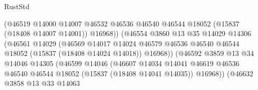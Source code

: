 \begin{lexlean}{RustStd}
\begin{coremodule}
                                        (@46519
                                          @14000
                                          @14007
                                          @46532
                                          @46536
                                          @46540
                                          @46544
                                          @18052
                                          (@15837 (@18408 @14007 @14001))
                                          @16968))
                                      (@46554
                                        @3860
                                        @13
                                        @35
                                        @14029
                                        @14306
                                        (@46561
                                          @14029
                                          (@46569
                                            @14017
                                            @14024
                                            @46579
                                            @46536
                                            @46540
                                            @46544
                                            @18052
                                            (@15837 (@18408 @14024 @14018))
                                            @16968))
                                        (@46592
                                          @3859
                                          @13
                                          @34
                                          @14046
                                          @14305
                                          (@46599
                                            @14046
                                            (@46607
                                              @14034
                                              @14041
                                              @46619
                                              @46536
                                              @46540
                                              @46544
                                              @18052
                                              (@15837 (@18408 @14041 @14035))
                                              @16968))
                                          (@46632
                                            @3858
                                            @13
                                            @33
                                            @14063

\end{coremodule}
\end{lexlean}
